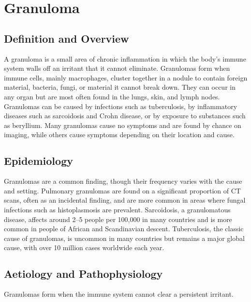 \chapter{Granuloma}

\section*{Definition and Overview}
A granuloma is a small area of chronic inflammation in which the body's immune system walls off an irritant that it cannot eliminate. Granulomas form when immune cells, mainly macrophages, cluster together in a nodule to contain foreign material, bacteria, fungi, or material it cannot break down. They can occur in any organ but are most often found in the lungs, skin, and lymph nodes. Granulomas can be caused by infections such as tuberculosis, by inflammatory diseases such as sarcoidosis and Crohn disease, or by exposure to substances such as beryllium. Many granulomas cause no symptoms and are found by chance on imaging, while others cause symptoms depending on their location and cause.

\section*{Epidemiology}
Granulomas are a common finding, though their frequency varies with the cause and setting. Pulmonary granulomas are found on a significant proportion of CT scans, often as an incidental finding, and are more common in areas where fungal infections such as histoplasmosis are prevalent. Sarcoidosis, a granulomatous disease, affects around 2--5 people per 100,000 in many countries and is more common in people of African and Scandinavian descent. Tuberculosis, the classic cause of granulomas, is uncommon in many countries but remains a major global cause, with over 10 million cases worldwide each year.

\section*{Aetiology and Pathophysiology}
Granulomas form when the immune system cannot clear a persistent irritant.

